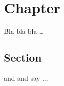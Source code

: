\chapter{Chapter }
\label{sec:Chapter}

Bla bla bla \dots

\section{Section}
\label{sec:Section}

\cite{Hilal1995} and \cite{Spencer1986} and \cite{Scott1981} say ...